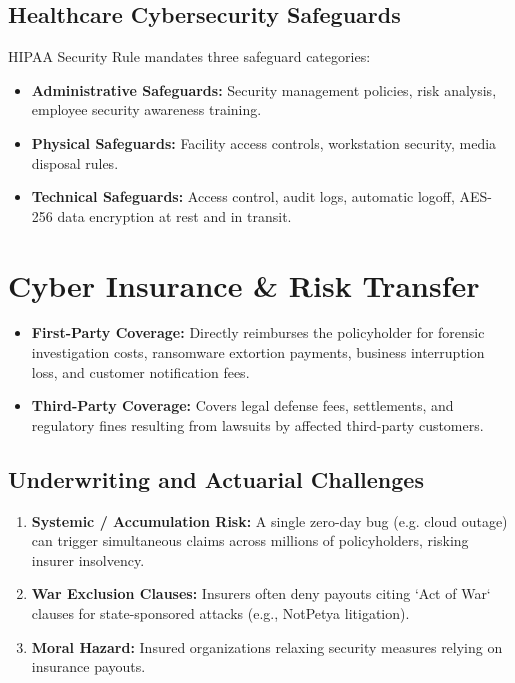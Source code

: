 \documentclass[12pt,a4paper]{article}
\begin{document}
\subsection{Healthcare Cybersecurity Safeguards}
HIPAA Security Rule mandates three safeguard categories:
\begin{itemize}[leftmargin=*, itemsep=3pt]
  \item \textbf{Administrative Safeguards:} Security management policies, risk analysis, employee security awareness training.
  \item \textbf{Physical Safeguards:} Facility access controls, workstation security, media disposal rules.
  \item \textbf{Technical Safeguards:} Access control, audit logs, automatic logoff, AES-256 data encryption at rest and in transit.
\end{itemize}

\section{Cyber Insurance \& Risk Transfer}

\begin{tcolorbox}[defbox, title={\textbf{Definition: Cyber Insurance Coverage Tiers}}]
\begin{itemize}[leftmargin=*, itemsep=3pt]
  \item \textbf{First-Party Coverage:} Directly reimburses the policyholder for forensic investigation costs, ransomware extortion payments, business interruption loss, and customer notification fees.
  \item \textbf{Third-Party Coverage:} Covers legal defense fees, settlements, and regulatory fines resulting from lawsuits by affected third-party customers.
\end{itemize}
\end{tcolorbox}

\subsection{Underwriting and Actuarial Challenges}
\begin{enumerate}[leftmargin=*, itemsep=3pt]
  \item \textbf{Systemic / Accumulation Risk:} A single zero-day bug (e.g. cloud outage) can trigger simultaneous claims across millions of policyholders, risking insurer insolvency.
  \item \textbf{War Exclusion Clauses:} Insurers often deny payouts citing `Act of War` clauses for state-sponsored attacks (e.g., NotPetya litigation).
  \item \textbf{Moral Hazard:} Insured organizations relaxing security measures relying on insurance payouts.
\end{enumerate}
\end{document}
